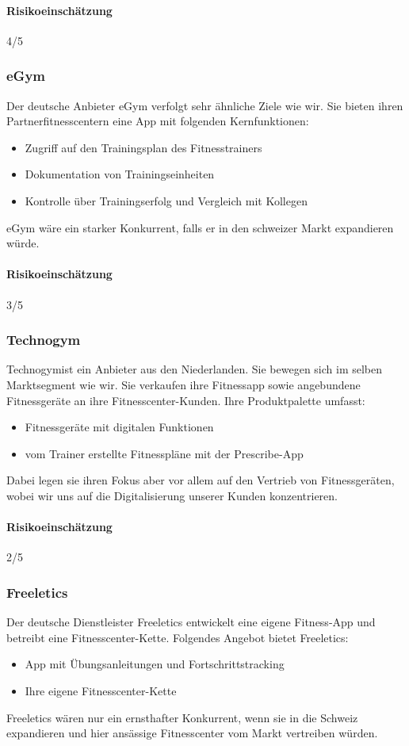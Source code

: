 \paragraph{Risikoeinschätzung} \qquad {} 4/5

\clearpage

\subsubsection{eGym}
Der deutsche Anbieter eGym\cite{egym} verfolgt sehr ähnliche Ziele wie wir. Sie bieten ihren Partnerfitnesscentern eine App mit folgenden Kernfunktionen:
\begin{itemize}
	\item Zugriff auf den Trainingsplan des Fitnesstrainers
	\item Dokumentation von Trainingseinheiten
	\item Kontrolle über Trainingserfolg und Vergleich mit Kollegen
\end{itemize}
eGym wäre ein starker Konkurrent, falls er in den schweizer Markt expandieren würde.
\paragraph{Risikoeinschätzung} \qquad {} 3/5

\subsubsection{Technogym}
Technogym\cite{technogym}ist ein Anbieter aus den Niederlanden. Sie bewegen sich im selben Marktsegment wie wir. Sie verkaufen ihre Fitnessapp sowie angebundene Fitnessgeräte an ihre Fitnesscenter-Kunden.
Ihre Produktpalette umfasst:
\begin{itemize}
	\item Fitnessgeräte mit digitalen Funktionen
	\item vom Trainer erstellte Fitnesspläne mit der Prescribe-App
\end{itemize}
Dabei legen sie ihren Fokus aber vor allem auf den Vertrieb von Fitnessgeräten, wobei wir uns auf die Digitalisierung unserer Kunden konzentrieren.
\paragraph{Risikoeinschätzung} \qquad {} 2/5
\subsubsection{Freeletics}
Der deutsche Dienstleister Freeletics\cite{freeletics} entwickelt eine eigene Fitness-App und betreibt eine Fitnesscenter-Kette.
Folgendes Angebot bietet Freeletics:
\begin{itemize}
	\item App mit Übungsanleitungen und Fortschrittstracking
	\item Ihre eigene Fitnesscenter-Kette
\end{itemize}
Freeletics wären nur ein ernsthafter Konkurrent, wenn sie in die Schweiz expandieren und hier ansässige Fitnesscenter vom Markt vertreiben würden.
